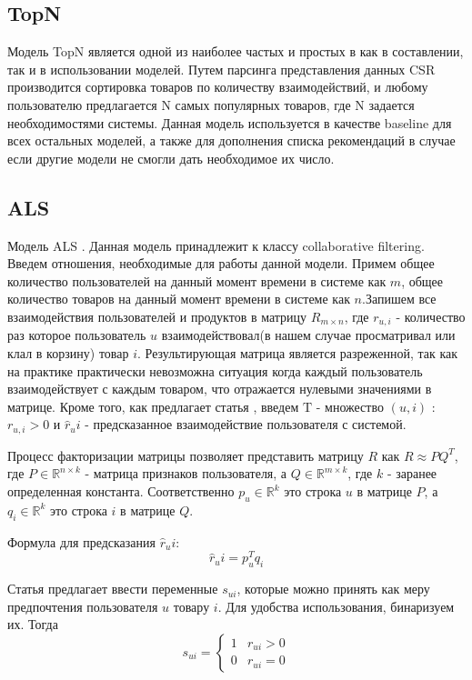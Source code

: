 \documentclass[14pt]{mmcs_article}
\begin{document}
\subsection{TopN}
Модель TopN является одной из наиболее частых и простых в как в составлении, так и в использовании моделей. Путем парсинга представления данных CSR производится сортировка товаров по количеству взаимодействий, и любому пользователю предлагается N самых популярных товаров, где N задается необходимостями системы. Данная модель используется в качестве baseline для всех остальных моделей, а также для дополнения списка рекомендаций в случае если другие модели не смогли дать необходимое их число.
\subsection{ALS}
Модель ALS \cite{ALSA1}. Данная модель принадлежит к классу collaborative filtering. \\
Введем отношения, необходимые для работы данной модели.
Примем общее количество пользователей на данный момент времени в системе как $m$, общее количество товаров на данный момент времени в системе как $n$.Запишем все взаимодействия пользователей и продуктов в матрицу $R_{m \times n}$, где $r_{u,i}$ - количество раз которое пользователь $u$ взаимодействовал(в нашем случае просматривал или клал в корзину) товар $i$.  Результирующая матрица является разреженной, так как на практике практически невозможна ситуация когда каждый пользователь взаимодействует с каждым товаром, что отражается нулевыми значениями в матрице. Кроме того, как предлагает статья \cite {ALS:rwe}, введем $\mathrm{T}$ - множество $(u, i)$ :$r_{u,i} > 0$ и $\hat{r}_ui$ - предсказанное взаимодействие пользователя с системой.

Процесс факторизации матрицы позволяет представить матрицу $R$ как $R \approx P Q^T$, где $P \in  \mathbb {R}^{n\times k}$ - матрица признаков пользователя, а  $Q \in  \mathbb {R}^{m\times k}$, где $k$ - заранее определенная константа. 
Соответственно $p_u \in \mathbb {R}^{k}$ это строка $u$ в матрице $P$, а $q_i \in \mathbb {R}^{k}$ это строка $i$ в матрице $Q$. 

Формула для предсказания  $\hat{r}_ui$:
\begin{equation}
	 \hat{r}_ui = p_u^T q_i
\end{equation}

Статья \cite{ALS:CFIFD} предлагает ввести переменные $s_{ui}$, которые можно принять как меру предпочтения пользователя $u$ товару $i$. Для удобства использования, бинаризуем их. Тогда
\begin{equation}
	s_{ui} = \begin{cases}
		1 & r_{ui} > 0 \\
		0 & r_{ui} = 0
	\end{cases}
\end{equation}
\end{document}
